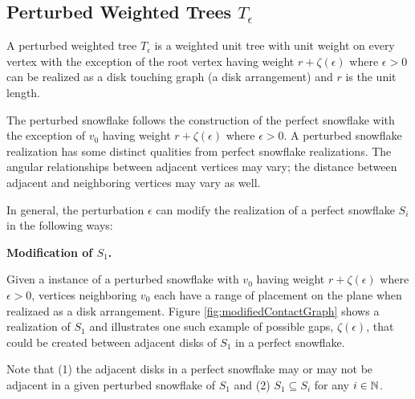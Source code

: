 
\subsection{Perturbed Weighted Trees $T_\epsilon$}

A perturbed weighted tree $T_\epsilon$ is a weighted unit tree with unit weight on every vertex with the exception of the root vertex having weight $r+\zeta(\epsilon)$ where $\epsilon>0$ can be realized as a disk touching graph (a disk arrangement) and $r$ is the unit length.  

The perturbed snowflake follows the construction of the perfect snowflake with the exception of $v_0$ having weight $r+ \zeta(\epsilon)$ where $\epsilon > 0$.
A perturbed snowflake realization has some distinct qualities from perfect snowflake realizations.  
The angular relationships between adjacent vertices may vary; the distance between adjacent and neighboring vertices may vary as well.


In general, the perturbation $\epsilon$ can modify the realization of a perfect snowflake $S_i$ in the following ways:

\textbf{Modification of $S_1$.} 

Given a instance of a perturbed snowflake with $v_0$ having weight $r + \zeta(\epsilon)$ where $\epsilon > 0$, vertices neighboring $v_0$ each have a range of placement on the plane when realizaed as a disk arrangement. 
Figure \ref{fig:modifiedContactGraph} shows a realization of $S_1$ and illustrates one such example of possible gaps, $\zeta(\epsilon)$, that could be created between adjacent disks of $S_1$ in a perfect snowflake.  

Note that (1) the adjacent disks in a perfect snowflake may or may not be adjacent in a given perturbed snowflake of $S_1$ and (2) $S_1 \subseteq S_i$ for any $i \in {\mathbb{N}}$.  